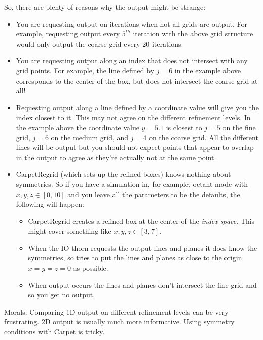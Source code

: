 \begin{enumerate}
  So, there are plenty of reasons why the output might be strange:
  \begin{itemize}
  \item You are requesting output on iterations when not all grids are
    output. For example, requesting output every $5^{\text{}th}$
    iteration with the above grid structure would only output the
    coarse grid every 20 iterations.
  \item You are requesting output along an index that does not
    intersect with any grid points. For example, the line defined by
    $j = 6$ in the example above corresponds to the center of the box,
    but does not intersect the coarse grid at all!
  \item Requesting output along a line defined by a coordinate value
    will give you the index closest to it. This may not agree on the
    different refinement levels. In the example above the coordinate
    value $y=5.1$ is closest to $j=5$ on the fine grid, $j=6$ on the
    medium grid, and $j=4$ on the coarse grid. All the different lines
    will be output but you should not expect points that appear to
    overlap in the output to agree as they're actually not at the same
    point. 
  \item CarpetRegrid (which sets up the refined boxes) knows nothing
    about symmetries. So if you have a simulation in, for example,
    octant mode with $x,y,z\in[0,10]$ and you leave all the parameters
    to be the defaults, the following will happen:
    \begin{itemize}
    \item CarpetRegrid creates a refined box at the center of the
      \textit{index space}. This might cover something like
      $x,y,z\in[3,7]$. 
    \item When the IO thorn requests the output lines and planes it
      does know the symmetries, so tries to put the lines and planes
      as close to the origin $x=y=z=0$ as possible.
    \item When output occurs the lines and planes don't intersect the
      fine grid and so you get no output.
    \end{itemize}
  \end{itemize}
  
  Morals: Comparing 1D output on different refinement levels can be
  very frustrating. 2D output is usually much more informative. Using
  symmetry conditions with Carpet is tricky.
\end{enumerate}

